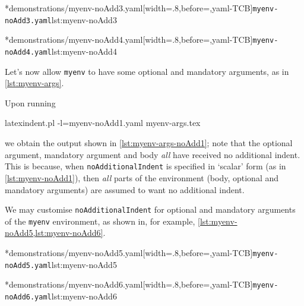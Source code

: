 	\begin{minipage}{.45\textwidth}
		\cmhlistingsfromfile[style=yaml-LST]*{demonstrations/myenv-noAdd3.yaml}[width=.8\linewidth,before=\centering,yaml-TCB]{\texttt{myenv-noAdd3.yaml}}{lst:myenv-noAdd3}
	\end{minipage}
	\hfill
	\begin{minipage}{.45\textwidth}
		\cmhlistingsfromfile[style=yaml-LST]*{demonstrations/myenv-noAdd4.yaml}[width=.8\linewidth,before=\centering,yaml-TCB]{\texttt{myenv-noAdd4.yaml}}{lst:myenv-noAdd4}
	\end{minipage}


	Let's now allow \texttt{myenv} to have some optional and mandatory arguments, as
	in \cref{lst:myenv-args}. 


    Upon running
	\begin{commandshell}
latexindent.pl -l=myenv-noAdd1.yaml myenv-args.tex  
\end{commandshell}
	we obtain the output shown in \cref{lst:myenv-args-noAdd1}; note that the optional argument,
	mandatory argument and body \emph{all} have received no additional indent.
	This is because, when \texttt{noAdditionalIndent} is specified in `scalar' form (as in
	\cref{lst:myenv-noAdd1}), then \emph{all} parts of the environment (body,
	optional and mandatory arguments) are assumed to want no additional indent.

	We may customise \texttt{noAdditionalIndent} for optional and mandatory arguments of the
	\texttt{myenv} environment, as shown in, for example, \cref{lst:myenv-noAdd5,lst:myenv-noAdd6}.

	\begin{minipage}{.49\textwidth}
		\cmhlistingsfromfile[style=yaml-LST]*{demonstrations/myenv-noAdd5.yaml}[width=.8\linewidth,before=\centering,yaml-TCB]{\texttt{myenv-noAdd5.yaml}}{lst:myenv-noAdd5}
	\end{minipage}
	\hfill
	\begin{minipage}{.49\textwidth}
		\cmhlistingsfromfile[style=yaml-LST]*{demonstrations/myenv-noAdd6.yaml}[width=.8\linewidth,before=\centering,yaml-TCB]{\texttt{myenv-noAdd6.yaml}}{lst:myenv-noAdd6}
	\end{minipage}

